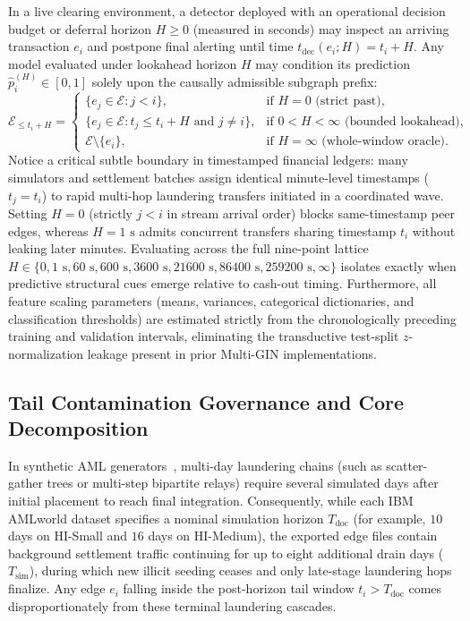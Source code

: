 \documentclass[pdflatex,sn-mathphys,Numbered]{sn-jnl}
\theoremstyle{thmstyleone}
\begin{document}
In a live clearing environment, a detector deployed with an operational decision budget or deferral horizon $H \ge 0$ (measured in seconds) may inspect an arriving transaction $e_i$ and postpone final alerting until time $t_{\text{dec}}(e_i; H) = t_i + H$. Any model evaluated under lookahead horizon $H$ may condition its prediction $\hat{p}_i^{(H)} \in [0, 1]$ solely upon the causally admissible subgraph prefix:
\begin{equation}\label{eq:causal_prefix}
\mathcal{E}_{\le t_i + H} = \begin{cases}
\{ e_j \in \mathcal{E} : j < i \}, & \text{if } H = 0 \text{ (strict past)}, \\
\{ e_j \in \mathcal{E} : t_j \le t_i + H \text{ and } j \neq i \}, & \text{if } 0 < H < \infty \text{ (bounded lookahead)}, \\
\mathcal{E} \setminus \{e_i\}, & \text{if } H = \infty \text{ (whole-window oracle)}.
\end{cases}
\end{equation}
Notice a critical subtle boundary in timestamped financial ledgers: many simulators and settlement batches assign identical minute-level timestamps ($t_j = t_i$) to rapid multi-hop laundering transfers initiated in a coordinated wave. Setting $H = 0$ (strictly $j < i$ in stream arrival order) blocks same-timestamp peer edges, whereas $H = 1\text{ s}$ admits concurrent transfers sharing timestamp $t_i$ without leaking later minutes. Evaluating across the full nine-point lattice $H \in \{0, 1\text{ s}, 60\text{ s}, 600\text{ s}, 3600\text{ s}, 21600\text{ s}, 86400\text{ s}, 259200\text{ s}, \infty\}$ isolates exactly when predictive structural cues emerge relative to cash-out timing. Furthermore, all feature scaling parameters (means, variances, categorical dictionaries, and classification thresholds) are estimated strictly from the chronologically preceding training and validation intervals, eliminating the transductive test-split $z$-normalization leakage present in prior Multi-GIN implementations.

\subsection{Tail Contamination Governance and Core Decomposition}\label{sec:tail_audit}

In synthetic AML generators~\cite{altman2023ibmaml}, multi-day laundering chains (such as scatter-gather trees or multi-step bipartite relays) require several simulated days after initial placement to reach final integration. Consequently, while each IBM AMLworld dataset specifies a nominal simulation horizon $T_{\text{doc}}$ (for example, $10$ days on HI-Small and $16$ days on HI-Medium), the exported edge files contain background settlement traffic continuing for up to eight additional drain days ($T_{\text{sim}}$), during which new illicit seeding ceases and only late-stage laundering hops finalize. Any edge $e_i$ falling inside the post-horizon tail window $t_i > T_{\text{doc}}$ comes disproportionately from these terminal laundering cascades.
\end{document}
